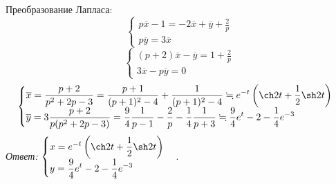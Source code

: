 \documentclass[14pt, a4paper, titlepage, fleqn]{extarticle}
\begin{document}
\begin{enumerate}
            Преобразование Лапласа:
            \[
                \begin{cases}
                    p \overline{x}-1 = -2 \overline{x} + \overline{y} + \frac{2}{p} \\
                    p \overline{y} = 3\overline{x}
                \end{cases}
            \]
            \[
                \begin{cases}
                    (p + 2)\overline{x} - \overline{y} = 1 + \frac{2}{p} \\
                    3\overline{x} - p \overline{y} = 0
                \end{cases}
            \]
            \[
                \begin{cases}
                    \displaystyle \overline{x} = \frac{p+2}{p^2+2p-3} = \frac{p+1}{(p+1)^2 - 4} + \frac{1}{(p+1)^2 - 4} \fallingdotseq e^{-t} \left(\ch 2t + \frac{1}{2} \sh 2t \right)   \\
                    \displaystyle \overline{y} = 3\frac{p+2}{p(p^2 + 2p - 3)} = \frac{9}{4}\frac{1}{p-1} - \frac{2}{p} - \frac{1}{4}\frac{1}{p+3} \fallingdotseq \frac{9}{4} e^t - 2 - \frac{1}{4} e^{-3}
                \end{cases}
            \]
            \textit{Ответ:} \( 
                \begin{cases}
                    \displaystyle x = e^{-t} \left(\ch 2t + \frac{1}{2} \sh 2t \right)   \\
                    \displaystyle y = \frac{9}{4} e^t - 2 - \frac{1}{4} e^{-3}
                \end{cases}
            \).


    \end{enumerate}
    
\end{document}
